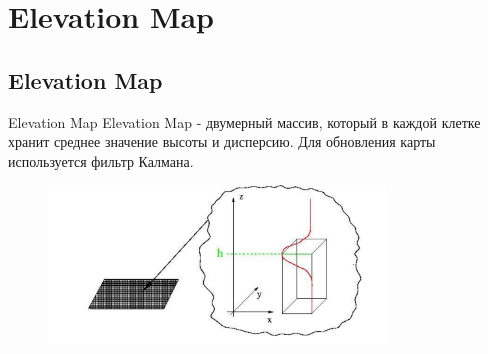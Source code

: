 \documentclass[9pt]{beamer}
\begin{document}

\section{Elevation Map}

\subsection{Elevation Map}


\begin{frame}{Elevation Map}
  Elevation Map - двумерный массив, который в каждой клетке хранит среднее значение высоты и дисперсию.
  Для обновления карты используется фильтр Калмана.

  \begin{figure}[h]
    \centering
    \includegraphics[width=0.8\textwidth]{elev_m_grid.png}
  \end{figure}
\end{frame}
\end{document}
